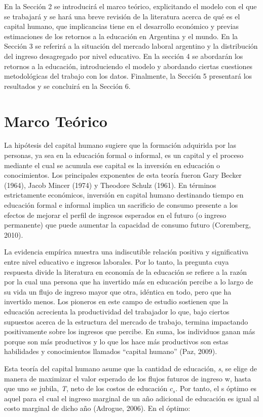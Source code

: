\documentclass[a4paper]{article}
\theoremstyle{plain}
\theoremstyle{definition}
\begin{document}
En la Sección 2 se introducirá el marco teórico, explicitando el modelo con el que se trabajará y se hará una breve revisión de la literatura acerca de qué es el capital humano, que implicancias tiene en el desarrollo económico y previas estimaciones de los retornos a la educación en Argentina y el mundo. En la Sección 3 se referirá a la situación del mercado laboral argentino y la distribución del ingreso desagregado por nivel educativo. En la sección 4 se abordarán los retornos a la educación, introduciendo el modelo y abordando ciertas cuestiones metodológicas del trabajo con los datos. Finalmente, la Sección 5 presentará los resultados y se concluirá en la Sección 6. 

\section{Marco Teórico}
\label{sec:marco_teorico}

La hipótesis del capital humano sugiere que la formación adquirida por las personas, ya sea en la educación formal o informal, es un capital y el proceso mediante el cual se acumula ese capital es la inversión en educación o conocimientos. Los principales exponentes de esta teoría fueron Gary Becker (1964), Jacob Mincer (1974) y Theodore Schulz (1961). En términos estrictamente económicos, inversión en capital humano destinando tiempo en educación formal e informal implica un sacrificio de consumo presente a los efectos de mejorar el perfil de ingresos esperados en el futuro (o ingreso permanente) que puede aumentar la capacidad de consumo futuro (Coremberg, 2010).

La evidencia empírica muestra una indiscutible relación positiva y significativa entre nivel educativo e ingresos laborales. Por lo tanto, la pregunta cuya respuesta divide la literatura en economía de la educación se refiere a la razón por la cual una persona que ha invertido más en educación percibe a lo largo de su vida un flujo de ingreso mayor que otra, idéntica en todo, pero que ha invertido menos. Los pioneros en este campo de estudio sostienen que la educación acrecienta la productividad del trabajador lo que, bajo ciertos supuestos acerca de la estructura del mercado de trabajo, termina impactando positivamente sobre los ingresos que percibe. En suma, los individuos ganan más porque son más productivos y lo que los hace más productivos son estas habilidades y conocimientos llamados “capital humano” (Paz, 2009).

Esta teoría del capital humano asume que la cantidad de educación, \textit{s}, se elige de manera de maximizar el valor esperado de los flujos futuros de ingreso w, hasta que uno se jubila, \textit{T}, neto de los costos de educación $c_s$. Por tanto, el s óptimo es aquel para el cual el ingreso marginal de un año adicional de educación es igual al costo marginal de dicho año (Adrogue, 2006). En el óptimo: 
\end{document}
